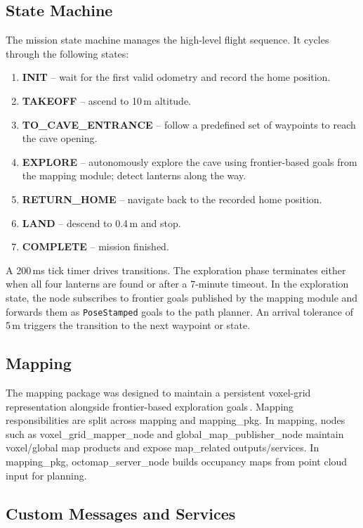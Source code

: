 \documentclass[twocolumn]{article}
\begin{document}
\subsection{State Machine}

The mission state machine manages the high-level flight sequence.
It cycles through the following states:
\begin{enumerate}
  \item \textbf{INIT} -- wait for the first valid odometry and record the home position.
  \item \textbf{TAKEOFF} -- ascend to 10\,m altitude.
  \item \textbf{TO\_CAVE\_ENTRANCE} -- follow a predefined set of waypoints to reach the cave opening.
  \item \textbf{EXPLORE} -- autonomously explore the cave using frontier-based goals from the mapping module; detect lanterns along the way.
  \item \textbf{RETURN\_HOME} -- navigate back to the recorded home position.
  \item \textbf{LAND} -- descend to 0.4\,m and stop.
  \item \textbf{COMPLETE} -- mission finished.
\end{enumerate}
A 200\,ms tick timer drives transitions.
The exploration phase terminates either when all four lanterns are found or after a 7-minute timeout.
In the exploration state, the node subscribes to frontier goals published by the mapping module and forwards them as \texttt{PoseStamped} goals to the path planner.
An arrival tolerance of 5\,m triggers the transition to the next waypoint or state.

\subsection{Mapping}

The mapping package was designed to maintain a persistent voxel-grid representation alongside frontier-based exploration goals\,\cite{Yamauchi1997}.
Mapping responsibilities are split across mapping and mapping\_pkg. In mapping, nodes such as voxel\_grid\_mapper\_node and global\_map\_publisher\_node maintain voxel/global map products and expose map\_related outputs/services. In mapping\_pkg, octomap\_server\_node builds occupancy maps from point cloud input for planning.

\subsection{Custom Messages and Services}
\end{document}
